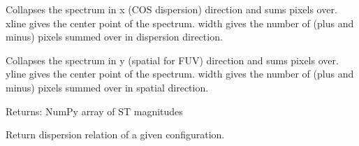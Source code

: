 \documentclass[letterpaper,10pt,english]{sphinxmanual}
\begin{document}

\begin{fulllineitems}
\label{SamPy.plot.COSIHB:SamPy.plot.COSIHB.wrapper_OLD.collapseSpectrumX}
Collapses the spectrum in x (COS dispersion) direction and sums pixels over.
xline gives the center point of the spectrum.
width gives the number of (plus and minus) pixels summed over in dispersion direction.

\end{fulllineitems}



\begin{fulllineitems}
\label{SamPy.plot.COSIHB:SamPy.plot.COSIHB.wrapper_OLD.collapseSpectrumY}
Collapses the spectrum in y (spatial for FUV) direction and sums pixels over.
yline gives the center point of the spectrum.
width gives the number of (plus and minus) pixels summed over in spatial direction.

\end{fulllineitems}



\begin{fulllineitems}
\label{SamPy.plot.COSIHB:SamPy.plot.COSIHB.wrapper_OLD.fluxToSTMag}
Returns:
NumPy array of ST magnitudes

\end{fulllineitems}



\begin{fulllineitems}
\label{SamPy.plot.COSIHB:SamPy.plot.COSIHB.wrapper_OLD.getDispersion}
Return dispersion relation of a given configuration.

\end{fulllineitems}
\end{document}
